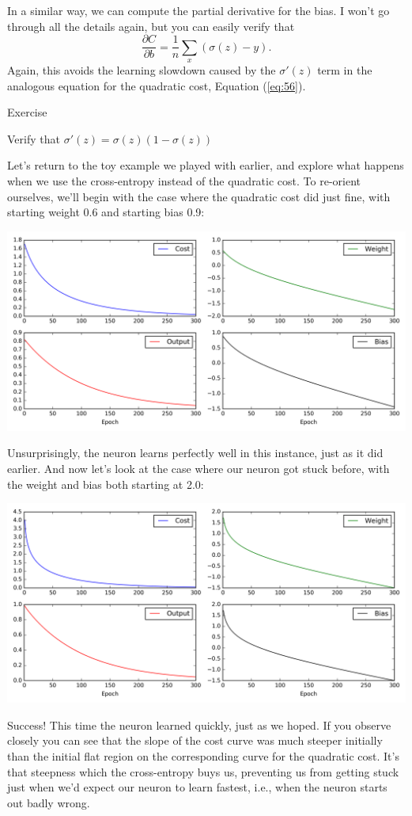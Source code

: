 \documentclass[a4paper,twoside,10pt]{book}
\begin{document}
In a similar way, we can compute the partial derivative for the bias. I won't go through all the details again, but you can easily verify that
\begin{equation}
	\frac{\partial C}{\partial b} = \frac{1}{n} \sum_x (\sigma(z)-y).
	\label{eq:62}
\end{equation}
Again, this avoids the learning slowdown caused by the $\sigma'(z)$ term in the analogous equation for the quadratic cost, Equation (\ref{eq:56}).

\begin{exercize}{Exercise}
	\item Verify that $\sigma'(z) = \sigma(z)(1-\sigma(z))$
\end{exercize}
Let's return to the toy example we played with earlier, and explore what happens when we use the cross-entropy instead of the quadratic cost. To re-orient ourselves, we'll begin with the case where the quadratic cost did just fine, with starting weight 0.6 and starting bias 0.9:
\begin{center}%
	\includegraphics[width=0.8\linewidth]{./figures/ch3/animation_33}
\end{center}
Unsurprisingly, the neuron learns perfectly well in this instance, just as it did earlier. And now let's look at the case where our neuron got stuck before, with the weight and bias both starting at 2.0:
\begin{center}%
	\includegraphics[width=0.8\linewidth]{./figures/ch3/animation_34}
\end{center}
Success! This time the neuron learned quickly, just as we hoped. If you observe closely you can see that the slope of the cost curve was much steeper initially than the initial flat region on the corresponding curve for the quadratic cost. It's that steepness which the cross-entropy buys us, preventing us from getting stuck just when we'd expect our neuron to learn fastest, i.e., when the neuron starts out badly wrong.
\end{document}
